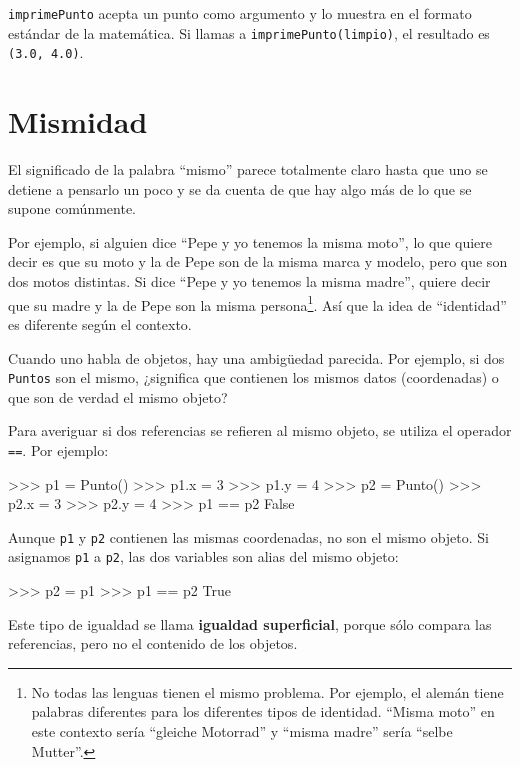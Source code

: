 \texttt{imprimePunto} acepta un punto como argumento y lo muestra
en el formato estándar de la matemática. Si llamas a \texttt{imprimePunto(limpio)},
el resultado es \texttt{(3.0, 4.0)}.

\section{Mismidad}


El significado de la palabra ``mismo'' parece totalmente claro hasta
que uno se detiene a pensarlo un poco y se da cuenta de que hay algo
más de lo que se supone comúnmente.

  

Por ejemplo, si alguien dice ``Pepe y yo tenemos la misma moto'',
lo que quiere decir es que su moto y la de Pepe son de la misma marca
y modelo, pero que son dos motos distintas. Si dice ``Pepe y yo tenemos
la misma madre'', quiere decir que su madre y la de Pepe son la misma
persona\footnote{No todas las lenguas tienen el mismo problema. Por ejemplo, el alemán
tiene palabras diferentes para los diferentes tipos de identidad.
``Misma moto'' en este contexto sería ``gleiche Motorrad'' y ``misma
madre'' sería ``selbe Mutter''.}. Así que la idea de ``identidad'' es diferente según el contexto.

Cuando uno habla de objetos, hay una ambigüedad parecida. Por ejemplo,
si dos \texttt{Puntos} son el mismo, ¿significa que contienen los
mismos datos (coordenadas) o que son de verdad el mismo objeto?

Para averiguar si dos referencias se refieren al mismo objeto, se
utiliza el operador \texttt{==}. Por ejemplo:
\begin{pyconcode}
>>> p1 = Punto()
>>> p1.x = 3
>>> p1.y = 4
>>> p2 = Punto()
>>> p2.x = 3
>>> p2.y = 4
>>> p1 == p2
False
\end{pyconcode}

Aunque \texttt{p1} y \texttt{p2} contienen las mismas coordenadas,
no son el mismo objeto. Si asignamos \texttt{p1} a \texttt{p2}, las
dos variables son alias del mismo objeto:
\begin{pyconcode}
>>> p2 = p1
>>> p1 == p2
True
\end{pyconcode}

Este tipo de igualdad se llama \textbf{igualdad superficial}, porque
sólo compara las referencias, pero no el contenido de los objetos.

